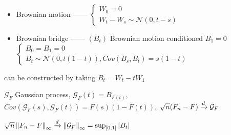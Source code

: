 \begin{itemize}
    \item Brownian motion ------ $\begin{cases}
                                      W_0 = 0\\
                                      W_t - W_s \sim \mathcal{N}(0, t-s)
    \end{cases}$
    \item Brownian bridge ------ $(B_t)$ Brownian motion conditioned $B_1 = 0$\\$\begin{cases}
                                      B_0 = B_1 = 0\\
                                                                                     B_t \sim \mathcal{N}(0, t(1- t)), Cov(B_s, B_t) = s(1 - t)
    \end{cases}$
\end{itemize}

\begin{fact}
    can be constructed by taking $B_t = W_t - tW_1$
\end{fact}

\begin{thm}
    $\mathcal{G}_F$ Gaussian process, $\mathcal{G}_F(t) = B_{F(t)}$, $Cov(\mathcal{G}_F(s), \mathcal{G}_F(t)) = F(s)(1 - F(t))$,
    $\sqrt{n}(F_n - F) \xrightarrow{d} \mathcal{G}_F$
\end{thm}

\begin{thm}
    $\sqrt{n}\left\lVert F_n - F\right\rVert_\infty \xrightarrow{d} \left\lVert\mathcal{G}_F\right\rVert_\infty = \sup_{[0,1]}|B_t|$
\end{thm}

